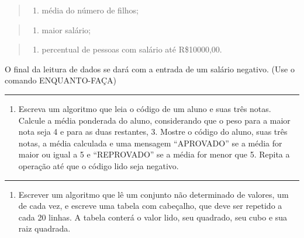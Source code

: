 \documentclass[12pt,a4paper]{article}
\providecommand{\tightlist}{%
      \setlength{\itemsep}{0pt}\setlength{\parskip}{0pt}}
\begin{document}
\begin{quote}
\begin{enumerate}
\def\labelenumi{\alph{enumi})}
\setcounter{enumi}{1}
\tightlist
\item
  média do número de filhos;
\end{enumerate}
\end{quote}

\begin{quote}
\begin{enumerate}
\def\labelenumi{\alph{enumi})}
\setcounter{enumi}{2}
\tightlist
\item
  maior salário;
\end{enumerate}
\end{quote}

\begin{quote}
\begin{enumerate}
\def\labelenumi{\alph{enumi})}
\setcounter{enumi}{3}
\tightlist
\item
  percentual de pessoas com salário até R\$10000,00.
\end{enumerate}
\end{quote}

O final da leitura de dados se dará com a entrada de um salário
negativo. (Use o comando ENQUANTO-FAÇA)

    \begin{center}\rule{0.5\linewidth}{0.5pt}\end{center}

\begin{enumerate}
\def\labelenumi{\arabic{enumi}.}
\setcounter{enumi}{5}
\tightlist
\item
  Escreva um algoritmo que leia o código de um aluno e suas três notas.
  Calcule a média ponderada do aluno, considerando que o peso para a
  maior nota seja 4 e para as duas restantes, 3. Mostre o código do
  aluno, suas três notas, a média calculada e uma mensagem ``APROVADO''
  se a média for maior ou igual a 5 e ``REPROVADO'' se a média for menor
  que 5. Repita a operação até que o código lido seja negativo.
\end{enumerate}

    \begin{center}\rule{0.5\linewidth}{0.5pt}\end{center}

\begin{enumerate}
\def\labelenumi{\arabic{enumi}.}
\setcounter{enumi}{6}
\tightlist
\item
  Escrever um algoritmo que lê um conjunto não determinado de valores,
  um de cada vez, e escreve uma tabela com cabeçalho, que deve ser
  repetido a cada 20 linhas. A tabela conterá o valor lido, seu
  quadrado, seu cubo e sua raiz quadrada.
\end{enumerate}
\end{document}
